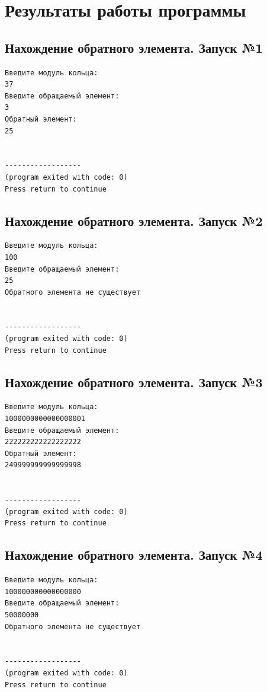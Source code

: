 \documentclass[a4paper,12pt]{article} %
\begin{document}
\clearpage

\section*{Результаты работы программы}

\subsection*{Нахождение обратного элемента. Запуск №1}
\begin{verbatim}
Введите модуль кольца:
37
Введите обращаемый элемент:
3
Обратный элемент:
25


------------------
(program exited with code: 0)
Press return to continue
\end{verbatim}

\subsection*{Нахождение обратного элемента. Запуск №2}
\begin{verbatim}
Введите модуль кольца:
100
Введите обращаемый элемент:
25
Обратного элемента не существует


------------------
(program exited with code: 0)
Press return to continue
\end{verbatim}

\subsection*{Нахождение обратного элемента. Запуск №3}
\begin{verbatim}
Введите модуль кольца:
1000000000000000001
Введите обращаемый элемент:
222222222222222222
Обратный элемент:
249999999999999998


------------------
(program exited with code: 0)
Press return to continue
\end{verbatim}

\subsection*{Нахождение обратного элемента. Запуск №4}
\begin{verbatim}
Введите модуль кольца:
100000000000000000
Введите обращаемый элемент:
50000000
Обратного элемента не существует


------------------
(program exited with code: 0)
Press return to continue
\end{verbatim}
\end{document}
